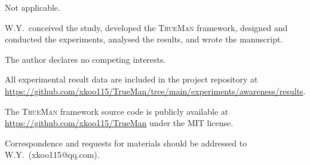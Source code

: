 \documentclass[pdflatex,sn-mathphys-num]{sn-jnl}
\newcommand{\TrueMan}{\textsc{TrueMan}}
\theoremstyle{thmstyleone}%
\theoremstyle{thmstyletwo}%
\theoremstyle{thmstylethree}%
\begin{document}

Not applicable.


W.Y.\ conceived the study, developed the \TrueMan{} framework, designed and conducted the experiments, analysed the results, and wrote the manuscript.


The author declares no competing interests.


All experimental result data are included in the project repository at \url{https://github.com/xkoo115/TrueMan/tree/main/experiments/awareness/results}.


The \TrueMan{} framework source code is publicly available at \url{https://github.com/xkoo115/TrueMan} under the MIT license.


Correspondence and requests for materials should be addressed to W.Y.\ (xkoo115@qq.com).
\end{document}
